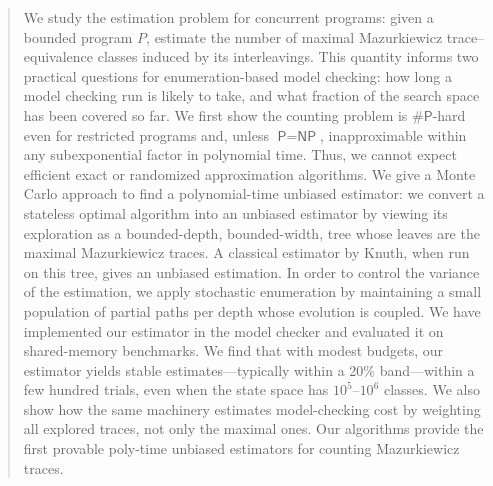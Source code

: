 
\begin{abstract}
We study the estimation problem for concurrent programs: given a bounded program $P$, estimate the number of maximal Mazurkiewicz trace–equivalence classes induced by its interleavings. 
This quantity informs two practical questions for enumeration-based model checking: how long a model checking run is likely to take, 
and what fraction of the search space has been covered so far. 
We first show the counting problem is $\#\textsf{P}$-hard even for restricted programs and, unless $\textsf{P}=\textsf{NP}$, inapproximable within any subexponential factor in polynomial time.
Thus, we cannot expect efficient exact or randomized approximation algorithms. 
We give a Monte Carlo approach to find a polynomial-time unbiased estimator: 
we convert a stateless optimal \dpor algorithm into an unbiased estimator by viewing its exploration as a bounded-depth, bounded-width, tree 
whose leaves are the maximal Mazurkiewicz traces. 
A classical estimator by Knuth, when run on this tree, gives an unbiased estimation.
In order to control the variance of the estimation, we apply stochastic enumeration by maintaining a small population of partial paths per depth whose evolution is coupled. 
We have implemented our estimator in the \jmc model checker and evaluated it on shared-memory benchmarks.
We find that with modest budgets, our estimator yields stable 
estimates---typically within a 20\% band---within a few hundred trials, 
even when the state space has $10^{5}$--$10^{6}$ classes. 
We also show how the same machinery estimates model-checking cost by weighting all explored traces, not only the maximal ones. 
Our algorithms provide the first provable poly-time unbiased estimators for counting Mazurkiewicz traces.
\end{abstract}


